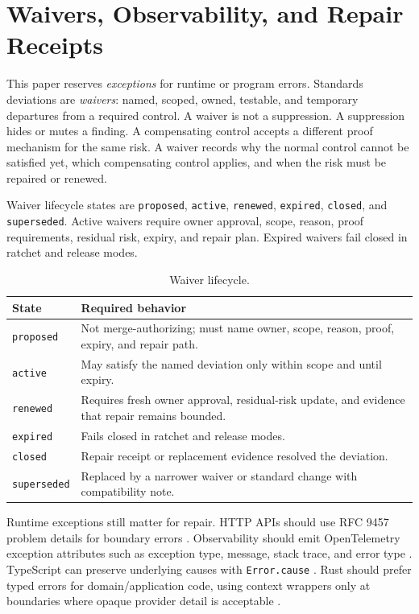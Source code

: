 \section{Waivers, Observability, and Repair Receipts}

This paper reserves \emph{exceptions} for runtime or program errors. Standards deviations are \emph{waivers}: named, scoped, owned, testable, and temporary departures from a required control. A waiver is not a suppression. A suppression hides or mutes a finding. A compensating control accepts a different proof mechanism for the same risk. A waiver records why the normal control cannot be satisfied yet, which compensating control applies, and when the risk must be repaired or renewed.

Waiver lifecycle states are \texttt{proposed}, \texttt{active}, \texttt{renewed}, \texttt{expired}, \texttt{closed}, and \texttt{superseded}. Active waivers require owner approval, scope, reason, proof requirements, residual risk, expiry, and repair plan. Expired waivers fail closed in ratchet and release modes.

\begin{table}[t]
\caption{Waiver lifecycle.}
\label{tab:waiver-lifecycle}
\centering
\scriptsize
\begin{tabularx}{\columnwidth}{L{0.22\columnwidth} Y}
\toprule
\textbf{State} & \textbf{Required behavior} \\
\midrule
\texttt{proposed} & Not merge-authorizing; must name owner, scope, reason, proof, expiry, and repair path. \\
\texttt{active} & May satisfy the named deviation only within scope and until expiry. \\
\texttt{renewed} & Requires fresh owner approval, residual-risk update, and evidence that repair remains bounded. \\
\texttt{expired} & Fails closed in ratchet and release modes. \\
\texttt{closed} & Repair receipt or replacement evidence resolved the deviation. \\
\texttt{superseded} & Replaced by a narrower waiver or standard change with compatibility note. \\
\bottomrule
\end{tabularx}
\end{table}

Runtime exceptions still matter for repair. HTTP APIs should use RFC 9457 problem details for boundary errors \cite{rfc9457ProblemDetails2023}. Observability should emit OpenTelemetry exception attributes such as exception type, message, stack trace, and error type \cite{otelSemanticConventions2026,otelExceptionAttributes2026}. TypeScript can preserve underlying causes with \texttt{Error.cause} \cite{mdnErrorCause2026}. Rust should prefer typed errors for domain/application code, using context wrappers only at boundaries where opaque provider detail is acceptable \cite{rustByExampleError2026,anyhowDocs2026}.

